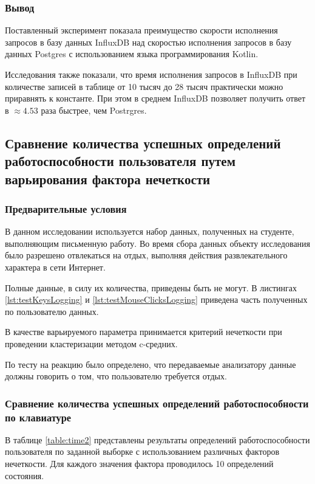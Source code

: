 \subsubsection*{Вывод}

Поставленный эксперимент показала преимущество скорости исполнения запросов в базу данных InfluxDB над скоростью исполнения запросов в базу данных Postgres с использованием языка программирования Kotlin.

Исследования также показали, что время исполнения запросов в InfluxDB при количестве записей в таблице от 10 тысяч до 28 тысяч практически можно приравнять к константе. При этом в среднем InfluxDB позволяет получить ответ в $\approx 4.53$ раза быстрее, чем Postrgres.

\subsection{Сравнение количества успешных определений работоспособности пользователя путем варьирования фактора нечеткости}

\subsubsection{Предварительные условия}

В данном исследовании используется набор данных, полученных на студенте, выполняющим письменную работу. Во время сбора данных объекту исследования было разрешено отвлекаться на отдых, выполняя действия развлекательного характера в сети Интернет.

Полные данные, в силу их количества, приведены быть не могут. В листингах \ref{lst:testKeysLogging} и \ref{lst:testMouseClicksLogging} приведена часть полученных по пользователю данных.

В качестве варьируемого параметра принимается критерий нечеткости при проведении кластеризации методом c-средних.

По тесту на реакцию было определено, что передаваемые анализатору данные должны говорить о том, что пользователю требуется отдых.

\subsubsection{Сравнение количества успешных определений работоспособности по клавиатуре}

В таблице \ref{table:time2} представлены результаты определений работоспособности пользователя по заданной выборке с использованием различных факторов нечеткости. Для каждого значения фактора проводилось 10 определений состояния.

